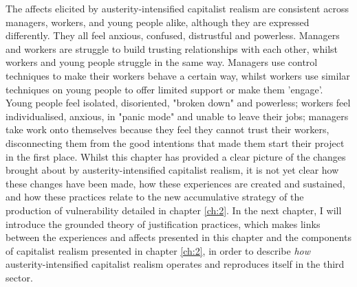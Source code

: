 The affects elicited by austerity-intensified capitalist realism are consistent across managers, workers, and young people alike, although they are expressed differently. They all feel anxious, confused, distrustful and powerless. Managers and workers are struggle to build trusting relationships with each other, whilst workers and young people struggle in the same way. Managers use control techniques to make their workers behave a certain way, whilst workers use similar techniques on young people to offer limited support or make them 'engage'. Young people feel isolated, disoriented, "broken down" and powerless; workers feel individualised, anxious, in "panic mode" and unable to leave their jobs; managers take work onto themselves because they feel they cannot trust their workers, disconnecting them from the good intentions that made them start their project in the first place. Whilst this chapter has provided a clear picture of the changes brought about by austerity-intensified capitalist realism, it is not yet clear how these changes have been made, how these experiences are created and sustained, and how these practices relate to the new accumulative strategy of the production of vulnerability detailed in chapter \ref{ch:2}. In the next chapter, I will introduce the grounded theory of justification practices, which makes links between the experiences and affects presented in this chapter and the components of capitalist realism presented in chapter \ref{ch:2}, in order to describe \emph{how} austerity-intensified capitalist realism operates and reproduces itself in the third sector. 
